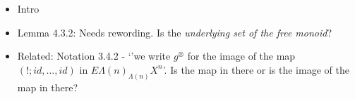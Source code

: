 \documentclass{amsart}
\begin{document}
\begin{itemize}
\item Intro
\item Lemma 4.3.2: Needs rewording. Is the \textit{underlying set of the free monoid}?
\item Related: Notation 3.4.2 - `'we write $g^\otimes$ for the image of the map $(!;id,\ldots,id)$ in $E\Lambda(n)_{\Lambda(n)}X^n$'. Is the map in there or is the image of the map in there?

\end{itemize}
\end{document}
